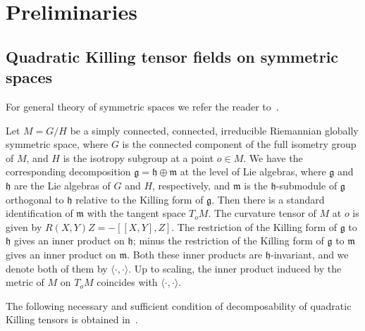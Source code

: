 \documentclass[10pt,a4paper]{amsart}
\newcommand\g{\mathfrak g}
\newcommand\h{\mathfrak h}
\newcommand\m{\mathfrak m}
\newcommand \<{\langle}
\renewcommand \>{\rangle}
\newcommand \ip{\<\cdot,\cdot\>}
\begin{document}
	
	\section{Preliminaries}
	\label{s:prel}
	
	\subsection{Quadratic Killing tensor fields on symmetric spaces}
	\label{ss:topslot}
	
	For general theory of symmetric spaces we refer the reader to~\cite{Hel,Wolf}.
	
	Let $M=G/H$ be a simply connected, connected, irreducible Riemannian globally symmetric space, where $G$ is the connected component of the full isometry group of $M$, and $H$ is the isotropy subgroup at a point $o \in M$. We have the corresponding decomposition $\g = \h \oplus \m$ at the level of Lie algebras, where $\g$ and $\h$ are the Lie algebras of $G$ and $H$, respectively, and $\m$ is the $\h$-submodule of $\g$ orthogonal to $\h$ relative to the Killing form of $\g$. Then there is a standard identification of $\m$ with the tangent space $T_oM$. The curvature tensor of $M$ at $o$ is given by $R(X,Y)Z = -[[X,Y],Z]$. The restriction of the Killing form of $\g$ to $\h$ gives an inner product on $\h$; minus the restriction of the Killing form of $\g$ to $\m$ gives an inner product on $\m$. Both these inner products are $\h$-invariant, and we denote both of them by $\ip$. Up to scaling, the inner product induced by the metric of $M$ on $T_oM$ coincides with $\ip$.
	
	The following necessary and sufficient condition of decomposability of quadratic Killing tensors is obtained in~\cite[Theorem~3, Remark~2]{MN2}.
	
\end{document}
